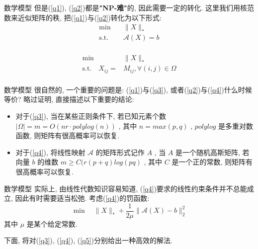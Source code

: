 \documentclass[slidestop,compress,mathserif,UTF8]{beamer}
\numberwithin{equation}{section}
\begin{document}
            \begin{frame}[t]{数学模型}
                但是(\ref{q1}), (\ref{q2})都是\textbf{"NP-难"}的, 因此需要一定的转化. 这里我们用核范数来近似矩阵的秩, 把(\ref{q1})与(\ref{q2})转化为以下形式:
                \begin{equation}
                    \begin{split}\label{q3}
                        \min \quad
                            & \lVert{X}\rVert_*\\
                        \text{s.t.} \quad
                            & \mathcal{A}(X) = b\\	
                    \end{split}
                \end{equation}
                
                \begin{equation}
                    \begin{split}\label{q4}
                        \min \quad
                            & \lVert{X}\rVert_*\\
                        \text{s.t.} \quad
                            X_{ij} = &M_{ij}, \forall(i,j)\in\Omega\\
                    \end{split}
                \end{equation}
            \end{frame}
            \begin{frame}[t]{数学模型 }
                很自然的, 一个重要的问题是: (\ref{q1})与(\ref{q3}), 或者(\ref{q2})与(\ref{q4})什么时候等价? 略过证明, 直接描述以下重要的结论:
                
                \begin{itemize}
                    \item 对于(\ref{q3}), 当在某些正则条件下, 若已知元素个数 $\lvert{\Omega}\rvert = m = O(nr \cdot polylog(n))$ , 其中 $n=max(p,q)$ , $polylog$ 是多重对数函数, 则矩阵有很高概率可以恢复.\\

                    \item 对于(\ref{q4}), 将线性映射 $\mathcal{A}$ 的矩阵形式记作 $A$ , 当 $A$ 是一个随机高斯矩阵, 若向量 $b$ 的维数 $m \ge C(r(p + q)log(pq)$ , 其中 $C$ 是一个正的常数, 则矩阵有很高概率可以恢复.
                \end{itemize}
            \end{frame}
            \begin{frame}[t]{数学模型}
                实际上, 由线性代数知识容易知道, (\ref{q4})要求的线性约束条件并不总能成立, 因此有时需要适当松弛. 考虑(\ref{q4})的罚函数:
                \begin{equation}\label{q5}
                    \min \quad \lVert{X}\rVert_*+ \frac{1}{2\mu} \lVert{\mathcal{A}(X) - b}\rVert_2^2
                \end{equation}
                \small{其中 $\mu$ 是某个给定常数.}\normalsize

                下面, 将对(\ref{q3}), (\ref{q4}), (\ref{q5})分别给出一种高效的解法.
            \end{frame}
\end{document}
